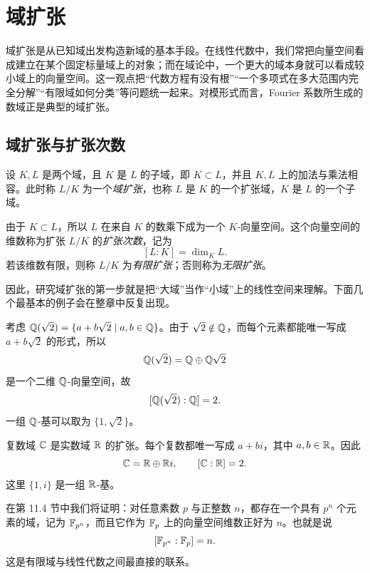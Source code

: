 \chapter{域扩张}

域扩张是从已知域出发构造新域的基本手段。在线性代数中，我们常把向量空间看成建立在某个固定标量域上的对象；而在域论中，一个更大的域本身就可以看成较小域上的向量空间。这一观点把“代数方程有没有根”“一个多项式在多大范围内完全分解”“有限域如何分类”等问题统一起来。对模形式而言，Fourier 系数所生成的数域正是典型的域扩张。

\section{域扩张与扩张次数}

\begin{definition}
设 $K,L$ 是两个域，且 $K$ 是 $L$ 的子域，即 $K\subset L$，并且 $K,L$ 上的加法与乘法相容。此时称 $L/K$ 为一个\emph{域扩张}，也称 $L$ 是 $K$ 的一个扩张域，$K$ 是 $L$ 的一个子域。

由于 $K\subset L$，所以 $L$ 在来自 $K$ 的数乘下成为一个 $K$-向量空间。这个向量空间的维数称为扩张 $L/K$ 的\emph{扩张次数}，记为
\[
[L:K]=\dim_K L.
\]
若该维数有限，则称 $L/K$ 为\emph{有限扩张}；否则称为\emph{无限扩张}。
\end{definition}

因此，研究域扩张的第一步就是把“大域”当作“小域”上的线性空间来理解。下面几个最基本的例子会在整章中反复出现。

\begin{example}
考虑 $\mathbb{Q}(\sqrt2)=\{a+b\sqrt2\mid a,b\in\mathbb{Q}\}$。由于 $\sqrt2\notin\mathbb{Q}$，而每个元素都能唯一写成 $a+b\sqrt2$ 的形式，所以
\[
\mathbb{Q}(\sqrt2)=\mathbb{Q}\oplus \mathbb{Q}\sqrt2
\]
是一个二维 $\mathbb{Q}$-向量空间，故
\[
[\mathbb{Q}(\sqrt2):\mathbb{Q}]=2.
\]
一组 $\mathbb{Q}$-基可以取为 $\{1,\sqrt2\}$。
\end{example}

\begin{example}
复数域 $\mathbb{C}$ 是实数域 $\mathbb{R}$ 的扩张。每个复数都唯一写成 $a+bi$，其中 $a,b\in\mathbb{R}$。因此
\[
\mathbb{C}=\mathbb{R}\oplus \mathbb{R} i,
\qquad [\mathbb{C}:\mathbb{R}]=2.
\]
这里 $\{1,i\}$ 是一组 $\mathbb{R}$-基。
\end{example}

\begin{example}
在第 11.4 节中我们将证明：对任意素数 $p$ 与正整数 $n$，都存在一个具有 $p^n$ 个元素的域，记为 $\mathbb{F}_{p^n}$，而且它作为 $\mathbb{F}_p$ 上的向量空间维数正好为 $n$。也就是说
\[
[\mathbb{F}_{p^n}:\mathbb{F}_p]=n.
\]
这是有限域与线性代数之间最直接的联系。
\end{example}

